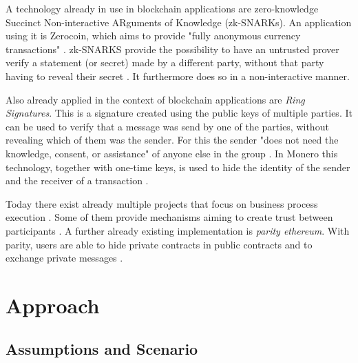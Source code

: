 \documentclass[runningheads]{llncs}
\newcommand{\comment}[1]{}
\newcommand{\comment}[1]{}
\begin{document}
A technology already in use in blockchain applications are zero-knowledge Succinct Non-interactive ARguments of Knowledge (zk-SNARKs). An application using it is Zerocoin, which aims to provide "fully anonymous currency transactions" \cite{miers2013zerocoin}. zk-SNARKS provide the possibility to have an untrusted prover verify a statement (or secret) made by a different party, without that party having to reveal their secret \cite{ben2013snarks}. It furthermore does so in a non-interactive manner. 



Also already applied in the context of blockchain applications are \textit{Ring Signatures}. This is a signature created using the public keys of multiple parties. It can be used to verify that a message was send by one of the parties, without revealing which of them was the sender. For this the sender "does not need the knowledge, consent, or assistance" of anyone else in the group  \cite{rivest2001leak}. In Monero this technology, together with one-time keys, is used to hide the identity of the sender and the receiver of a transaction  \cite{noether2016ring}.



Today there exist already multiple projects that focus on business process execution . Some of them provide mechanisms aiming to create trust between participants . A further already existing implementation is  \textit{parity ethereum}. With parity, users are able to hide private contracts in public contracts and to exchange private messages \cite{parity}.

\comment{However for private contract execution parity is relying on validators, "account[s] that can allow a private contract’s state [to] change" \cite{parity}. In our understanding this makes parity insufficient for untrusted business execution, since, like private blockchains, it requires trust in one or multiple nodes. 
}




\section{Approach} \label{sec:approach}

\subsection{Assumptions and Scenario} \label{subsec:assumptions}
\end{document}
